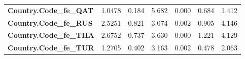 \begin{center}
\begin{tabular}{lcccccc}
\textbf{Country.Code\_fe\_QAT}                                     &       1.0478  &        0.184     &     5.682  &         0.000        &        0.684    &        1.412     \\
\textbf{Country.Code\_fe\_RUS}                                     &       2.5251  &        0.821     &     3.074  &         0.002        &        0.905    &        4.146     \\
\textbf{Country.Code\_fe\_THA}                                     &       2.6752  &        0.737     &     3.630  &         0.000        &        1.221    &        4.129     \\
\textbf{Country.Code\_fe\_TUR}                                     &       1.2705  &        0.402     &     3.163  &         0.002        &        0.478    &        2.063     \\
\bottomrule
\end{tabular}
\end{center}